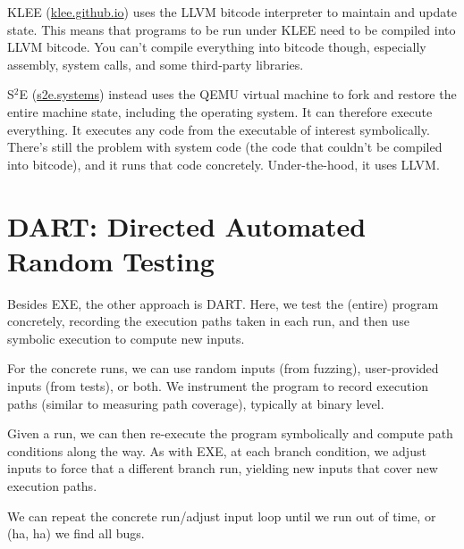 \documentclass[11pt]{article}
\begin{document}
KLEE (\url{klee.github.io}) uses the LLVM bitcode interpreter to maintain and update state. This means that programs to be run under KLEE need to be compiled into LLVM bitcode.
You can't compile everything into bitcode though, especially assembly, system calls, and some third-party libraries.

S$^2$E (\url{s2e.systems}) instead uses the QEMU virtual machine to fork and restore the entire machine state, including the operating system. It can therefore execute everything.
It executes any code from the executable of interest symbolically. There's still the problem with system code (the code that couldn't be compiled into bitcode), and it runs that
code concretely. Under-the-hood, it uses LLVM.

\section{DART: Directed Automated Random Testing}
Besides EXE, the other approach is DART. Here, we test the (entire) program concretely, recording the execution paths taken in each run, and then use symbolic execution to compute new inputs.

For the concrete runs, we can use random inputs (from fuzzing), user-provided inputs (from tests), or both. We instrument the program to record execution paths (similar to measuring
path coverage), typically at binary level.

Given a run, we can then re-execute the program symbolically and compute path conditions along the way. As with EXE, at each branch condition, we adjust inputs to force
that a different branch run, yielding new inputs that cover new execution paths.

We can repeat the concrete run/adjust input loop until we run out of time, or (ha, ha) we find all bugs.
\end{document}
